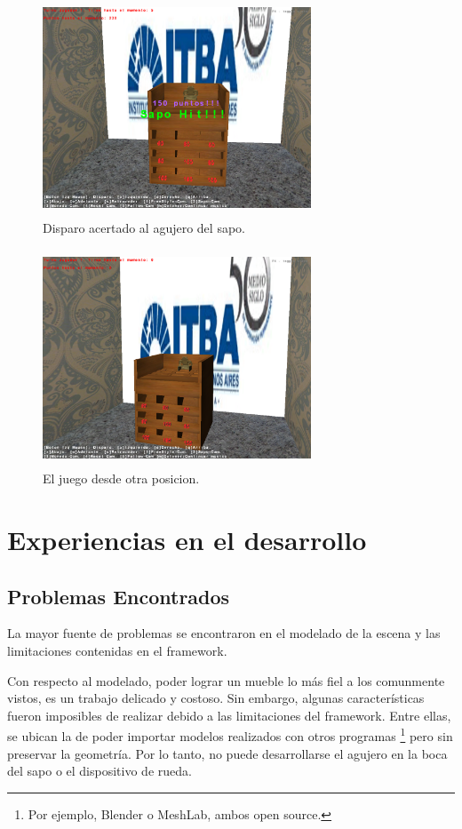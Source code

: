 \documentclass{acm_proc_article-sp}
\begin{document}
\begin{figure}[!ht]
	\centering
		\includegraphics[width=8cm,height=6.45cm]{img/sapoShoot.png}
	\caption{Disparo acertado al agujero del sapo.}
	\label{fig:sapoHit}
\end{figure}


\begin{figure}[!ht]
	\centering
		\includegraphics[width=8cm,height=6.45cm]{img/perspSapo.png}
	\caption{El juego desde otra posicion.}
	\label{fig:farSapo}
\end{figure}

\section{Experiencias en el desarrollo}

\subsection{Problemas Encontrados}

La mayor fuente de problemas se encontraron en el modelado de la escena y las limitaciones contenidas en el framework.

Con respecto al modelado, poder lograr un mueble lo m\'as fiel a los comunmente vistos, es un trabajo delicado y costoso. Sin embargo, algunas caracter\'isticas fueron imposibles de realizar debido a las limitaciones del framework. Entre ellas, se ubican la de poder importar modelos realizados con otros programas \footnote{Por ejemplo, Blender o MeshLab, ambos open source.} pero sin preservar la geometr\'ia. Por lo tanto, no puede desarrollarse el agujero en la boca del sapo o el dispositivo de rueda. 
\end{document}

